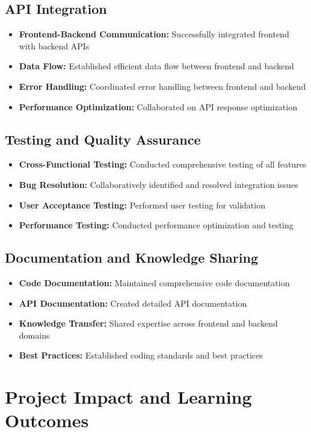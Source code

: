 \documentclass[12pt,a4paper]{report}
\begin{document}
\subsection{API Integration}
\begin{itemize}
    \item \textbf{Frontend-Backend Communication:} Successfully integrated frontend with backend APIs
    \item \textbf{Data Flow:} Established efficient data flow between frontend and backend
    \item \textbf{Error Handling:} Coordinated error handling between frontend and backend
    \item \textbf{Performance Optimization:} Collaborated on API response optimization
\end{itemize}

\subsection{Testing and Quality Assurance}
\begin{itemize}
    \item \textbf{Cross-Functional Testing:} Conducted comprehensive testing of all features
    \item \textbf{Bug Resolution:} Collaboratively identified and resolved integration issues
    \item \textbf{User Acceptance Testing:} Performed user testing for validation
    \item \textbf{Performance Testing:} Conducted performance optimization and testing
\end{itemize}

\subsection{Documentation and Knowledge Sharing}
\begin{itemize}
    \item \textbf{Code Documentation:} Maintained comprehensive code documentation
    \item \textbf{API Documentation:} Created detailed API documentation
    \item \textbf{Knowledge Transfer:} Shared expertise across frontend and backend domains
    \item \textbf{Best Practices:} Established coding standards and best practices
\end{itemize}

\section{Project Impact and Learning Outcomes}
\end{document}

